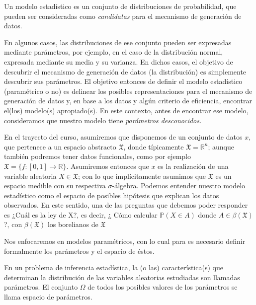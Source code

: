 \begin{definition} 
Un modelo estadístico es un conjunto de distribuciones de probabilidad, que pueden ser consideradas como \emph{candidatas} para el mecanismo de generación de datos. 
\end{definition}

En algunos casos, las distribuciones de ese conjunto pueden ser expresadas mediante parámetros, por ejemplo, en el caso de la distribución normal, expresada mediante su media y su varianza. En dichos casos, el objetivo  de descubrir el mecanismo de generación de datos (la distribución) es simplemente descubrir sus parámetros.  El objetivo entonces de definir el modelo estadístico (paramétrico o no) es delinear los posibles representaciones para el mecanismo de generación de datos y, en base a los datos y algún criterio de eficiencia, encontrar el(los) modelo(s) apropiado(s). En este contexto, antes de encontrar ese modelo, consideramos que nuestro modelo tiene \emph{parámetros desconocidos.}

En el trayecto del curso, asumiremos que disponemos de un conjunto de datos $x$, que pertenece a un espacio abstracto $\mathfrak{X}$, donde típicamente $\mathfrak{X} = \mathbb{R}^n$; aunque también podremos tener datos funcionales, como por ejemplo $\mathfrak{X} = \{f:[0,1]\rightarrow \mathbb{R} \}$. Asumiremos entonces  que $x$ es la realización de una variable aleatoria $X\in\mathfrak{X}$; con lo que implícitamente asumimos que $\mathfrak{X}$ es un espacio medible con su respectiva $\sigma$-álgebra. Podemos entender nuestro modelo estadístico como el espacio de posibles hipótesis que explican los datos observados. En este sentido, una de las preguntas que debemos poder responder es ¿Cuál es la ley de X?, es decir, ¿ Cómo calcular $\mathbb{P} (X\in A)$ donde $A \in \beta (\mathfrak{X})$?, con $\beta (\mathfrak{X})$ los borelianos de $\mathfrak{X}$

Nos enfocaremos en modelos paramétricos, con lo cual para es necesario definir formalmente los parámetros y el espacio de éstos.

\begin{definition} 
En un problema de inferencia estadística, la (o las) característica(s) que determinan la distribución de las variables aleatorias estudiadas son llamadas parámetros. El conjunto $\Omega$ de todos los posibles valores de los parámetros se llama espacio de parámetros.
\end{definition}

